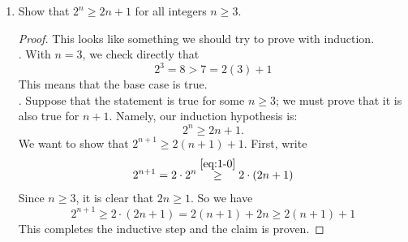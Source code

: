 \documentclass[12pt, reqno]{article}
\numberwithin{equation}{section}
\theoremstyle{definition}
\theoremstyle{remark}
\begin{document}
\begin{enumerate}[leftmargin=*]
\begin{proof}
		      \noindent{}. Clearly,
		      $$5^1 - 1 = 4,$$  which is certainly divisible by $4$. Hence, the base case is true.\\

		      \noindent{}. Assume that $5^n -1$ is divisible by $4$ for some $n \geq 1$ (this is the inductive hypothesis). We must show that $5^{n+1} - 1$ is also divisible by $4$. But, this is easily seen by writing
		      \begin{align*}
			      5^{n+1} - 1 = 5 \cdot 5^n - 1 & = \underbrace{5^n + 5^n + 5^n + 5^n}_{\text{4 times}} + \left(5^n - 1\right) \\
			                                    & = 4 \cdot 5^n + (5^n-1).
		      \end{align*}
		      Clearly, $4 \cdot 5^n$ is divisible by $4$. By the induction hypothesis, so is $5^n - 1$. Hence, $4$ must be a divisor of their sum, which is equal to $5^{n+1} -1$ by the calculations above.
	      \end{proof}


	\item Show that $2^n \geq 2n+1$ for all integers $n \geq 3$.

	      \begin{proof}
		      This looks like something we should try to prove with induction.\\

		      \noindent{}. With $n= 3$, we check directly that
		      \[
			      2^3 = 8> 7 = 2(3)+1
		      \]
		      This means that the base case is true.\\

		      \noindent{}. Suppose that the statement is true for some $n \geq 3$; we must prove that it is also true for $n+1$. Namely, our induction hypothesis is:
		      \begin{equation}\label{eq:1-0}
			      2^n \geq 2n+1.
		      \end{equation}
		      We want to show that $2^{n+1}\geq 2(n+1) + 1 $. First, write
		      \begin{align}\label{eq:1-00}
			      2^{n+1} = 2\cdot 2^n \overset{\eqref{eq:1-0}}{\geq} 2\cdot (2n+1)
		      \end{align}
		      Since $n \geq 3$, it is clear that $2n \geq 1$. So we have
		      \[
			      2^{n+1} \geq 2\cdot (2n+1) = 2(n+1) + 2n \geq 2(n+1) + 1
		      \]
		      This completes the inductive step and the claim is proven.
	      \end{proof}


\end{enumerate}
\end{document}
